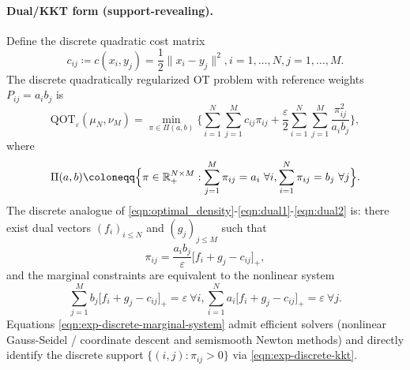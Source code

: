 \documentclass{article}
\theoremstyle{plain}
\theoremstyle{definition}
\theoremstyle{remark}
\numberwithin{equation}{section}
\newcommand{\R}{\mathbb{R}}
\newcommand{\QOT}{\mathrm{QOT}}
\begin{document}
\paragraph{Dual/KKT form (support-revealing).}
Define the discrete quadratic cost matrix
$$
c_{ij}\coloneqq c(x_i,y_j)=\frac12\|x_i-y_j\|^2, i=1,\dots,N,j=1,\dots,M.
$$
The discrete quadratically regularized OT problem with reference weights $P_{ij}=a_ib_j$ is
\begin{equation}\label{eqn:exp-discrete-primal-qot}
\QOT_\varepsilon(\mu_N,\nu_M)=\min_{\pi\in\Pi(a,b)}\Big\{\sum_{i=1}^N\sum_{j=1}^M c_{ij}\pi_{ij}+\frac{\varepsilon}{2}\sum_{i=1}^N\sum_{j=1}^M\frac{\pi_{ij}^2}{a_i b_j}\Big\},
\end{equation}
where
$$
\Pi(a,b)\coloneqq\Bigl\{\pi\in\R_+^{N\times M}:\sum_{j=1}^M\pi_{ij}=a_i\ \forall i,\sum_{i=1}^N\pi_{ij}=b_j\ \forall j\Bigr\}.
$$
The discrete analogue of \eqref{eqn:optimal_density}-\eqref{eqn:dual1}-\eqref{eqn:dual2} is: there exist dual vectors $(f_i)_{i\le N}$ and $(g_j)_{j\le M}$ such that
\begin{equation}\label{eqn:exp-discrete-kkt}
\pi_{ij}=\frac{a_ib_j}{\varepsilon}\bigl[f_i+g_j-c_{ij}\bigr]_+,
\end{equation}
and the marginal constraints are equivalent to the nonlinear system
\begin{equation}\label{eqn:exp-discrete-marginal-system}
\sum_{j=1}^Mb_j\bigl[f_i+g_j-c_{ij}\bigr]_+=\varepsilon\ \forall i,\sum_{i=1}^Na_i\bigl[f_i+g_j-c_{ij}\bigr]_+=\varepsilon\ \forall j.
\end{equation}
Equations \eqref{eqn:exp-discrete-marginal-system} admit efficient solvers (nonlinear Gauss-Seidel / coordinate descent and semismooth Newton methods) \citep{lorenz2021quadratically} and directly identify the discrete support $\{(i,j):\pi_{ij}>0\}$ via \eqref{eqn:exp-discrete-kkt}.
\end{document}
